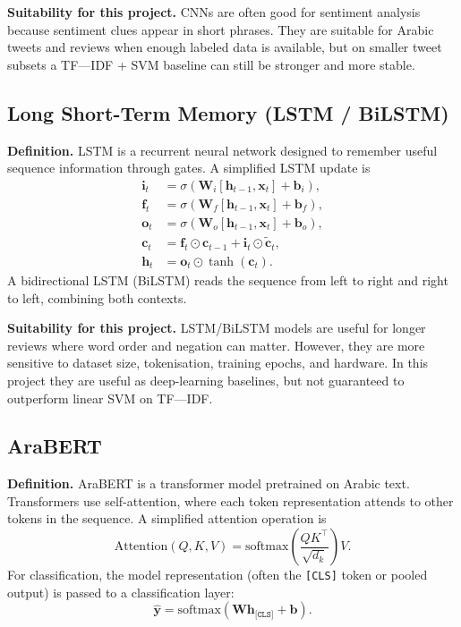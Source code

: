 \documentclass[11pt,a4paper]{report}
\begin{document}
\textbf{Suitability for this project.} CNNs are often good for sentiment analysis because sentiment clues appear in short phrases. They are suitable for Arabic tweets and reviews when enough labeled data is available, but on smaller tweet subsets a TF---IDF + SVM baseline can still be stronger and more stable.

\subsection{Long Short-Term Memory (LSTM / BiLSTM)}

\textbf{Definition.} LSTM is a recurrent neural network designed to remember useful sequence information through gates. A simplified LSTM update is
\begin{align}
    \mathbf{i}_t &= \sigma(\mathbf{W}_i[\mathbf{h}_{t-1}, \mathbf{x}_t] + \mathbf{b}_i),\\
    \mathbf{f}_t &= \sigma(\mathbf{W}_f[\mathbf{h}_{t-1}, \mathbf{x}_t] + \mathbf{b}_f),\\
    \mathbf{o}_t &= \sigma(\mathbf{W}_o[\mathbf{h}_{t-1}, \mathbf{x}_t] + \mathbf{b}_o),\\
    \mathbf{c}_t &= \mathbf{f}_t \odot \mathbf{c}_{t-1} + \mathbf{i}_t \odot \tilde{\mathbf{c}}_t,\\
    \mathbf{h}_t &= \mathbf{o}_t \odot \tanh(\mathbf{c}_t).
\end{align}
A bidirectional LSTM (BiLSTM) reads the sequence from left to right and right to left, combining both contexts.

\textbf{Suitability for this project.} LSTM/BiLSTM models are useful for longer reviews where word order and negation can matter. However, they are more sensitive to dataset size, tokenisation, training epochs, and hardware. In this project they are useful as deep-learning baselines, but not guaranteed to outperform linear SVM on TF---IDF.

\subsection{AraBERT}

\textbf{Definition.} AraBERT is a transformer model pretrained on Arabic text. Transformers use self-attention, where each token representation attends to other tokens in the sequence. A simplified attention operation is
\begin{equation}
    \mathrm{Attention}(Q,K,V)
    =
    \mathrm{softmax}\left(\frac{QK^{\top}}{\sqrt{d_k}}\right)V.
\end{equation}
For classification, the model representation (often the \texttt{[CLS]} token or pooled output) is passed to a classification layer:
\begin{equation}
    \hat{\mathbf{y}} = \mathrm{softmax}(\mathbf{W}\mathbf{h}_{\texttt{[CLS]}}+\mathbf{b}).
\end{equation}
\end{document}
